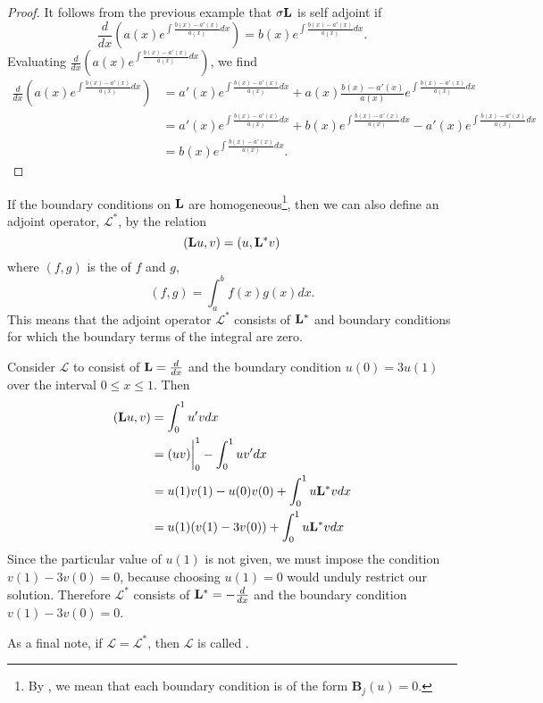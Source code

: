 \begin{proof}
	It follows from the previous example that \(\sigma\mathrm{\bf{L}}\) is self adjoint if
	\begin{equation*}
		\frac{d}{dx}\left(a(x)e^{\int \frac{b(x)-a'(x)}{a(x)}dx}\right) = b(x)e^{\int \frac{b(x)-a'(x)}{a(x)}dx}.
	\end{equation*}
	Evaluating \(\frac{d}{dx}\left(a(x)e^{\int \frac{b(x)-a'(x)}{a(x)}dx}\right)\), we find
	\begin{equation*}
		\begin{split}
			\frac{d}{dx}(a(x)e^{\int \frac{b(x)-a'(x)}{a(x)}dx}) &= a'(x)e^{\int \frac{b(x)-a'(x)}{a(x)}dx} + a(x)\frac{b(x)-a'(x)}{a(x)}e^{\int \frac{b(x)-a'(x)}{a(x)}dx}\\
			&=a'(x)e^{\int \frac{b(x)-a'(x)}{a(x)}dx} + b(x)e^{\int \frac{b(x)-a'(x)}{a(x)}dx} - a'(x)e^{\int \frac{b(x)-a'(x)}{a(x)}dx}\\
			&=b(x)e^{\int \frac{b(x)-a'(x)}{a(x)}dx}.
		\end{split}
	\end{equation*}
\end{proof}

\begin{definition}
	If the boundary conditions on \(\mathrm{\bf{L}}\) are homogeneous\footnote{By , we mean that each boundary condition is of the form \(\mathbf{B}_j (u)=0\).}, then we can also define an adjoint operator, \(\mathcal{L}^*\), by the relation
	\begin{equation}
		(\mathrm{\bf{L}} u,v) = (u,\mathrm{\bf{L^*}} v)
	\end{equation}
	where \((f,g)\) is the  of \(f\) and \(g\),
	\begin{equation}
		(f,g) = \int_a^bf(x)g(x)dx.
	\end{equation}
	This means that the adjoint operator \(\mathcal{L}^*\) consists of \(\mathrm{\bf{L^*}} \) and boundary conditions for which the boundary terms of the integral are zero. 
\end{definition}

\begin{example}
	Consider \(\mathcal{L}\) to consist of \(\mathrm{\bf{L}}=\frac{d}{dx}\) and the boundary condition \(u(0)=3u(1)\) over the interval \(0\leq x \leq 1\). Then
	\begin{equation}
		\begin{split}
			(\mathrm{\bf{L}} u,v) &= \int_0^1u'vdx\\
			       &= (uv)\biggr\rvert_0^1 - \int_0^1 uv'dx\\
			       &= u(1)v(1)-u(0)v(0)+\int_0^1u\mathrm{\bf{L^*}} vdx\\
			       &= u(1)(v(1)-3v(0)) + \int_0^1u\mathrm{\bf{L^*}} vdx
		\end{split}
	\end{equation}
	Since the particular value of \(u(1)\) is not given, we must impose the condition \(v(1)-3v(0)=0\), because choosing \(u(1)=0\) would unduly restrict our solution. Therefore \(\mathcal{L^*}\) consists of \(\mathrm{\bf{L^*}} = -\frac{d}{dx}\) and the boundary condition \(v(1) - 3v(0)=0\). 
\end{example}As a final note, if \(\mathcal{L}=\mathcal{L}^*\), then \(\mathcal{L}\) is called .
